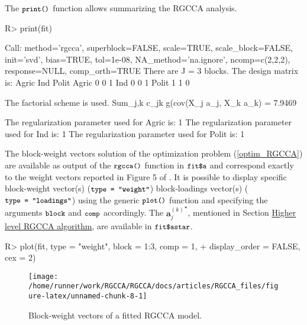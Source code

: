 \documentclass[
]{jss}
\begin{document}
\normalsize

The \(\small{\texttt{print()}}\) function allows summarizing the RGCCA
analysis.

\footnotesize

\begin{CodeChunk}
\begin{CodeInput}
R> print(fit)
\end{CodeInput}
\begin{CodeOutput}
Call: method='rgcca', superblock=FALSE, scale=TRUE, scale_block=FALSE, init='svd',
bias=TRUE, tol=1e-08, NA_method='na.ignore', ncomp=c(2,2,2), response=NULL,
comp_orth=TRUE 
There are J = 3 blocks.
The design matrix is:
      Agric Ind Polit
Agric     0   0     1
Ind       0   0     1
Polit     1   1     0

The factorial scheme is used.
Sum_{j,k} c_jk g(cov(X_j a_j, X_k a_k) = 7.9469 

The regularization parameter used for Agric is: 1
The regularization parameter used for Ind is: 1
The regularization parameter used for Polit is: 1
\end{CodeOutput}
\end{CodeChunk}

\normalsize

The block-weight vectors solution of the optimization problem
(\ref{optim_RGCCA}) are available as output of the
\(\small{\texttt{rgcca()}}\) function in \(\small{\texttt{fit\$a}}\) and
correspond exactly to the weight vectors reported in Figure 5 of
\cite{Tenenhaus2011}. It is possible to display specific block-weight
vector(s) (\(\small{\texttt{type = "weight"}}\)) block-loadings
vector(s) (\(\small{\texttt{type = "loadings"}}\)) using the generic
\(\small{\texttt{plot()}}\) function and specifying the arguments
\(\small{\texttt{block}}\) and \(\small{\texttt{comp}}\) accordingly.
The \({ \mathbf a_j^{(k)}}^\star\), mentioned in Section
\protect\hyperlink{higher-level-rgcca-algorithm}{Higher level RGCCA
algorithm}, are available in \(\small{\texttt{fit\$astar}}\).

\footnotesize

\begin{CodeChunk}
\begin{CodeInput}
R> plot(fit, type = "weight", block = 1:3, comp = 1,
+      display_order = FALSE, cex = 2)
\end{CodeInput}
\begin{figure}[H]

{\centering \texttt{[image: /home/runner/work/RGCCA/RGCCA/docs/articles/RGCCA\_files/figure-latex/unnamed-chunk-8-1]} 

}

\caption[Block-weight vectors of a fitted RGCCA model]{Block-weight vectors of a fitted RGCCA model.}\label{fig:unnamed-chunk-8}
\end{figure}
\end{CodeChunk}
\end{document}
